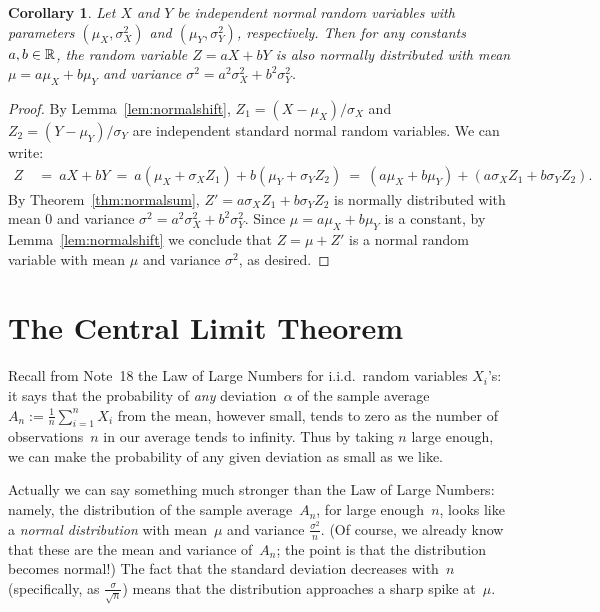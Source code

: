 \documentclass[11pt]{article}
\newcounter{thm}
\newtheorem{corollary}{Corollary}[thm]
\begin{document}
\begin{corollary}
Let $X$ and $Y$ be independent normal random variables with parameters $(\mu_X, \sigma^2_X)$ and $(\mu_Y, \sigma^2_Y)$, respectively. Then for any constants $a,b \in \mathbb{R}$, the random variable $Z = aX + bY$ is also normally distributed with mean $\mu = a\mu_X + b \mu_Y$ and variance $\sigma^2 = a^2 \sigma_X^2 + b^2 \sigma_Y^2$.
\end{corollary}
\begin{proof}
By Lemma~\ref{lem:normalshift}, $Z_1 = (X - \mu_X) / \sigma_X$ and $Z_2 = (Y - \mu_Y) / \sigma_Y$ are independent standard normal random variables. We can write:
\begin{align*}
Z ~&=~ aX + bY
~=~ a(\mu_X + \sigma_X Z_1) + b(\mu_Y + \sigma_Y Z_2)
~=~ (a\mu_X + b\mu_Y) + (a\sigma_X Z_1 + b\sigma_Y Z_2).
\end{align*}
By Theorem~\ref{thm:normalsum}, $Z' = a\sigma_X Z_1 + b\sigma_Y Z_2$ is normally distributed with mean $0$ and variance
$\sigma^2 = a^2 \sigma_X^2 + b^2 \sigma_Y^2$. Since $\mu = a\mu_X + b\mu_Y$ is a constant, by Lemma~\ref{lem:normalshift} we conclude that $Z = \mu + Z'$ is a normal random variable with mean $\mu$ and variance $\sigma^2$, as desired.
\end{proof}




\section*{The Central Limit Theorem}

Recall from Note~18 the Law of Large Numbers for i.i.d.\
random variables $X_i$'s: it says that the probability of {\it any\/}
deviation~$\alpha$ of the sample average $A_n :=
\frac{1}{n}{\sum_{i=1}^n X_i}$ from the mean, however small, tends
to zero as the number of observations~$n$ in our average tends to
infinity. Thus by taking $n$ large enough, we can make the
probability of any given deviation as small as we like.

Actually we can say something much stronger than the Law of Large
Numbers: namely, the distribution of the sample average~$A_n$, for
large enough~$n$, looks like a {\it normal distribution\/} with
mean~$\mu$ and variance $\frac{\sigma^2}{n}$.  (Of course, we
already know that these are the mean and variance of~$A_n$; the
point is that the distribution becomes normal!)  The fact that the
standard deviation decreases with~$n$ (specifically, as
$\frac{\sigma}{\sqrt{n}}$) means that the distribution approaches a
sharp spike at~$\mu$.
\end{document}
